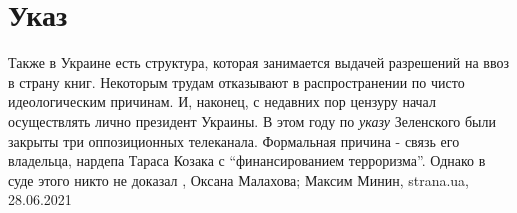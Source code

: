 
 
 
 
 
\chapter{Указ}
\label{sec:slova.ukaz}

Также в Украине есть структура, которая занимается выдачей разрешений на ввоз в
страну книг. Некоторым трудам отказывают в распространении по чисто
идеологическим причинам.  И, наконец, с недавних пор цензуру начал осуществлять
лично президент Украины. В этом году по \emph{указу} Зеленского были закрыты три
оппозиционных телеканала. Формальная причина - связь его владельца, нардепа
Тараса Козака с \enquote{финансированием терроризма}. Однако в суде этого никто не
доказал
, 
Оксана Малахова; Максим Минин, strana.ua, 28.06.2021

